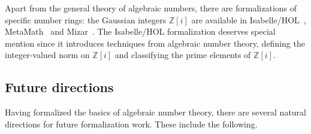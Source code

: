 \documentclass[a4paper,USenglish,cleveref, autoref, thm-restate]{lipics-v2021}
\newcommand{\Z}{\mathbb{Z}}
\begin{document}
Apart from the general theory of algebraic numbers, there are formalizations of specific number rings: the Gaussian integers $\Z[i]$ are available in Isabelle/HOL~\cite{gaussian_integers-isabelle}, MetaMath~\cite{gaussian_integers-metamath} and Mizar~\cite{gaussian_integers-mizar}.
The Isabelle/HOL formalization deserves special mention since it introduces techniques from algebraic number theory,
defining the integer-valued norm on $\Z[i]$ and classifying the prime elements of $\Z[i]$.

\subsection{Future directions}

Having formalized the basics of algebraic number theory, there are several natural directions for future formalization work. These include the following.
\end{document}
